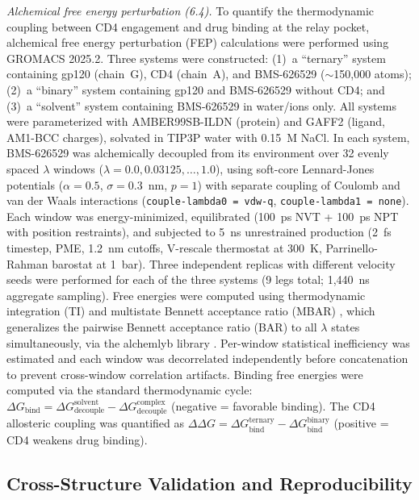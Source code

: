 \documentclass[11pt,a4paper]{article}
\begin{document}
\textit{Alchemical free energy perturbation (6.4).} To quantify the thermodynamic coupling between CD4 engagement and drug binding at the relay pocket, alchemical free energy perturbation (FEP) calculations were performed using GROMACS 2025.2. Three systems were constructed: (1)~a ``ternary'' system containing gp120 (chain~G), CD4 (chain~A), and BMS-626529 (${\sim}$150,000 atoms); (2)~a ``binary'' system containing gp120 and BMS-626529 without CD4; and (3)~a ``solvent'' system containing BMS-626529 in water/ions only. All systems were parameterized with AMBER99SB-ILDN (protein) and GAFF2 (ligand, AM1-BCC charges), solvated in TIP3P water with 0.15~M NaCl. In each system, BMS-626529 was alchemically decoupled from its environment over 32 evenly spaced $\lambda$ windows ($\lambda = 0.0, 0.03125, \ldots, 1.0$), using soft-core Lennard-Jones potentials ($\alpha = 0.5$, $\sigma = 0.3$~nm, $p = 1$) with separate coupling of Coulomb and van der Waals interactions (\texttt{couple-lambda0\,=\,vdw-q}, \texttt{couple-lambda1\,=\,none}). Each window was energy-minimized, equilibrated (100~ps NVT + 100~ps NPT with position restraints), and subjected to 5~ns unrestrained production (2~fs timestep, PME, 1.2~nm cutoffs, V-rescale thermostat at 300~K, Parrinello-Rahman barostat at 1~bar). Three independent replicas with different velocity seeds were performed for each of the three systems (9 legs total; 1,440~ns aggregate sampling). Free energies were computed using thermodynamic integration (TI) \citep{Kirkwood1935} and multistate Bennett acceptance ratio (MBAR) \citep{Shirts2008}, which generalizes the pairwise Bennett acceptance ratio (BAR) \citep{Bennett1976} to all $\lambda$ states simultaneously, via the alchemlyb library \citep{Shirts2017}. Per-window statistical inefficiency was estimated and each window was decorrelated independently before concatenation to prevent cross-window correlation artifacts. Binding free energies were computed via the standard thermodynamic cycle: $\Delta G_\mathrm{bind} = \Delta G_\mathrm{decouple}^\mathrm{solvent} - \Delta G_\mathrm{decouple}^\mathrm{complex}$ (negative = favorable binding). The CD4 allosteric coupling was quantified as $\Delta\Delta G = \Delta G_\mathrm{bind}^\mathrm{ternary} - \Delta G_\mathrm{bind}^\mathrm{binary}$ (positive = CD4 weakens drug binding).

\subsection{Cross-Structure Validation and Reproducibility}
\end{document}
